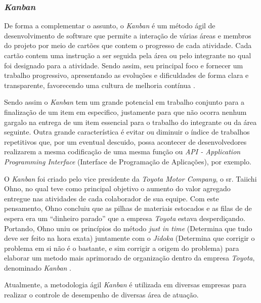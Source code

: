 \subsubsection{\textit{\textit{Kanban}}}

De forma a complementar o assunto, o \textit{Kanban} é um método ágil de desenvolvimento de software que permite a interação de várias áreas e membros do projeto por meio de cartões que contem o progresso de cada atividade. Cada cartão contem uma instrução a ser seguida pela área ou pelo integrante no qual foi designado para a atividade. Sendo assim, seu principal foco e fornecer um trabalho progressivo, apresentando as evoluções e dificuldades de forma clara e transparente, favorecendo uma cultura de melhoria contínua \cite{KANBAN2014}.

Sendo assim o \textit{Kanban} tem um grande potencial em trabalho conjunto para a finalização de um item em especifico, justamente para que não ocorra nenhum gargalo na entrega de um item essencial para o trabalho do integrante ou da área seguinte. Outra grande característica é evitar ou diminuir o índice de trabalhos repetitivos que, por um eventual descuido, possa acontecer de desenvolvedores realizarem a mesma codificação de uma mesma função ou \textit{API - Application Programming Interface} (Interface de Programação de Aplicações), por exemplo.

O \textit{Kanban} foi criado pelo vice presidente da \textit{Toyota Motor Company}, o sr. Taiichi Ohno, no qual teve como principal objetivo o aumento do valor agregado entregue nas atividades de cada colaborador de sua equipe. Com este pensamento,  Ohno concluiu que as pilhas de materiais estocados e as filas de de espera era um “dinheiro parado” que a empresa \textit{Toyota} estava desperdiçando. Portando,   Ohno uniu os princípios do método \textit{just in time} (Determina que tudo deve ser feito na hora exata)  juntamente com o \textit{Jidoka} (Determina que corrigir o problema em si não é o bastante, e sim corrigir a origem do problema) para elaborar um metodo mais aprimorado de organização dentro da empresa \textit{Toyota}, denominado \textit{Kanban} \cite{TOYOTA1977}.

Atualmente, a metodologia ágil \textit{Kanban} é utilizada em diversas empresas para realizar o controle de desempenho de diversas área de atuação.